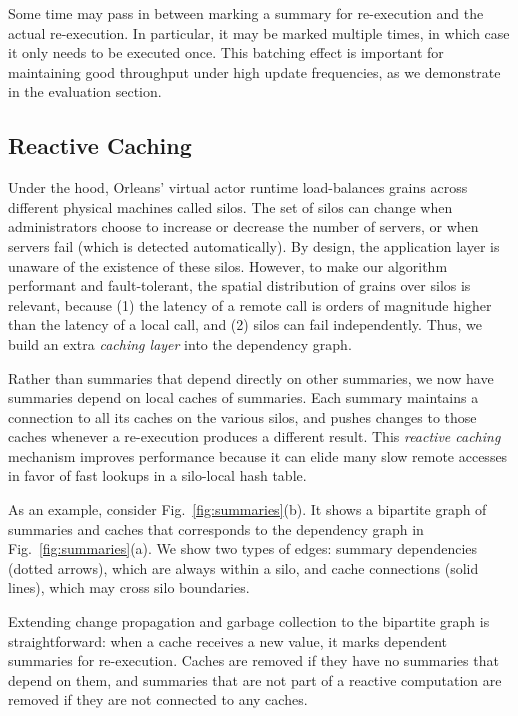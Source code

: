  Some time may pass in between marking a summary for re-execution and the actual re-execution. In particular, it may be marked multiple times, in which case it only needs to be executed once. This batching effect is important for maintaining good throughput under high update frequencies, as we demonstrate in the evaluation section.

\subsection{Reactive Caching}\label{sec:bp}

Under the hood, Orleans' virtual actor runtime load-balances grains across different physical machines called silos. The set of silos can change when administrators choose to increase or decrease the number of servers, or when servers fail (which is detected automatically). By design, the application layer is unaware of the existence of these silos. However, to make our algorithm performant and fault-tolerant, the spatial distribution of grains over silos is relevant, because (1) the latency of a remote call is orders of magnitude higher than the latency of a local call, and (2) silos can fail independently. Thus, we build an extra \emph{caching layer} into the dependency graph.

Rather than summaries that depend directly on other summaries, we now have summaries depend on local caches of summaries. Each summary maintains a connection to all its caches on the various silos, and pushes changes to those caches whenever a re-execution produces a different result. This \emph{reactive caching} mechanism improves performance because it can elide many slow remote accesses in favor of fast lookups in a silo-local hash table.

As an example, consider Fig.~\ref{fig:summaries}(b). It shows a bipartite graph of summaries and caches that corresponds to the dependency graph in Fig.~\ref{fig:summaries}(a). We show two types of edges: summary dependencies (dotted arrows), which are always within a silo, and cache connections (solid lines), which may cross silo boundaries. 

Extending change propagation and garbage collection to the bipartite graph is straightforward: when a cache receives a new value, it marks dependent summaries for re-execution. Caches are removed if they have no summaries that depend on them, and summaries that are not part of a reactive computation are removed if they are not connected to any caches. 

